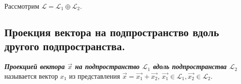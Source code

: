 Рассмотрим $\mathcal{L} = \mathcal{L}_1 \oplus \mathcal{L}_2$.

\subsection{
    Проекция вектора на подпространство вдоль другого подпространства.
}

\begin{definition}
    \textit{\textbf{Проекцией вектора $\vec{x}$ на подпространство $\mathcal{L}_1$ вдоль подпространства $\mathcal{L}_2$}} называется вектор $x_1$ из представления $\vec{x} = \vec{x_1} + \vec{x_2}$, $\vec{x_1} \in \mathcal{L}_1, \vec{x_2} \in \mathcal{L}_2$.
\end{definition}